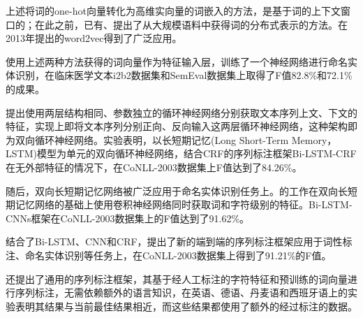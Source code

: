 上述将词的one-hot向量转化为高维实向量的词嵌入的方法，是基于词的上下文窗口的；在此之前，已有\citet{bengio2003neural}、\citet{mikolov2010recurrent}提出了从大规模语料中获得词的分布式表示的方法。\citet{mikolov2013distributed,mikolov2013efficient}在2013年提出的word2vec得到了广泛应用。

\citet{wu2015study}使用上述两种方法获得的词向量作为特征输入层，训练了一个神经网络进行命名实体识别，在临床医学文本i2b2数据集和SemEval数据集上取得了F值82.8\%和72.1\%的成果。

\citet{huang2015bidirectional}提出使用两层结构相同、参数独立的循环神经网络分别获取文本序列上文、下文的特征，实现上即将文本序列分别正向、反向输入这两层循环神经网络，这种架构即为双向循环神经网络。实验表明，以长短期记忆(Long Short-Term Memory， LSTM)模型为单元的双向循环神经网络，结合CRF的序列标注框架Bi-LSTM-CRF在无外部特征的情况下，在CoNLL-2003数据集上F值达到了84.26\%。

随后，双向长短期记忆网络被广泛应用于命名实体识别任务上。\citet{chiu2015named}的工作在双向长短期记忆网络的基础上使用卷积神经网络同时获取词和字符级别的特征。Bi-LSTM-CNNs框架在CoNLL-2003数据集上的F值达到了91.62\%。

\citet{ma2016end}结合了Bi-LSTM、CNN和CRF，提出了新的端到端的序列标注框架应用于词性标注、命名实体识别等任务上，在CoNLL-2003数据集上得到了91.21\%的F值。

\citet{lample2016neural}还提出了通用的序列标注框架，其基于经人工标注的字符特征和预训练的词向量进行序列标注，无需依赖额外的语言知识，在英语、德语、丹麦语和西班牙语上的实验表明其结果与当前最佳结果相近，而这些结果都使用了额外的经过标注的数据。

